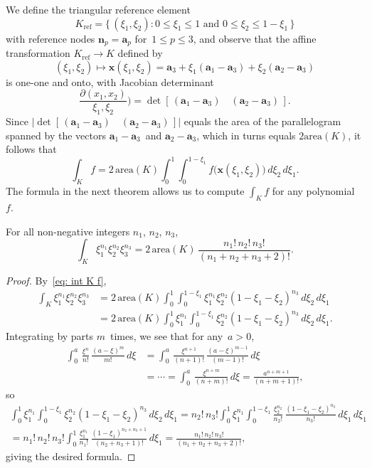 We define the triangular reference element
\[
K_{\mathrm{ref}}=\{\,(\xi_1,\xi_2):
    \text{$0\le\xi_1\le1$ and $0\le\xi_2\le 1-\xi_1$}\,\}
\]
with reference nodes $\boldsymbol{n}_p=\boldsymbol{a}_p$ for~$1\le p\le 3$,
and observe that the affine transformation $K_{\mathrm{ref}}\to K$ defined by
\[
(\xi_1,\xi_2)\mapsto\boldsymbol{x}(\xi_1,\xi_2)=\boldsymbol{a}_3
    +\xi_1(\boldsymbol{a}_1-\boldsymbol{a}_3)
    +\xi_2(\boldsymbol{a}_2-\boldsymbol{a}_3)
\]
is one-one and onto, with Jacobian determinant
\[
\frac{\partial(x_1,x_2)}{\xi_1,\xi_2})
    =\det[\,(\boldsymbol{a}_1-\boldsymbol{a}_3)\quad
            (\boldsymbol{a}_2-\boldsymbol{a}_3)\,].
\]
Since $\bigl|\det[\,(\boldsymbol{a}_1-\boldsymbol{a}_3)\quad
(\boldsymbol{a}_2-\boldsymbol{a}_3)\,]\bigr|$ equals the area of the 
parallelogram spanned by the vectors $\boldsymbol{a}_1-\boldsymbol{a}_3$~and 
$\boldsymbol{a}_2-\boldsymbol{a}_3$, which in turns equals $2\mathrm{area}(K)$, 
it follows that
\begin{equation}\label{eq: int K f}
\int_Kf=2\,\mathrm{area}(K)\int_0^1\int_0^{1-\xi_1}
    f\bigl(\boldsymbol{x}(\xi_1,\xi_2)\bigr)\,d\xi_2\,d\xi_1.
\end{equation}
The formula in the next theorem allows us to compute $\int_Kf$ for any 
polynomial~$f$.

\begin{theorem}\label{thm: int xi}
For all non-negative integers $n_1$, $n_2$, $n_3$,
\[
\int_K\xi_1^{n_1}\xi_2^{n_2}\xi_3^{n_3}=2\,\mathrm{area}(K)\,
    \frac{n_1!\,n_2!\,n_3!}{(n_1+n_2+n_3+2)!}.
\]
\end{theorem}
\begin{proof}
By~\eqref{eq: int K f},
\begin{align*}
\int_K\xi_1^{n_1}\xi_2^{n_2}\xi_3^{n_3}&=2\,\mathrm{area}(K)
    \int_0^1\int_0^{1-\xi_1}\xi_1^{n_1}\xi_2^{n_2}(1-\xi_1-\xi_2)^{n_3}
        \,d\xi_2\,d\xi_1\\
    &=2\,\mathrm{area}(K)
    \int_0^1\xi_1^{n_1}\int_0^{1-\xi_1}\xi_2^{n_2}(1-\xi_1-\xi_2)^{n_3}
        \,d\xi_2\,d\xi_1.
\end{align*}
Integrating by parts $m$~times, we see that for any~$a>0$,
\begin{align*}
\int_0^a\,\frac{\xi^n}{n!}\,\frac{(a-\xi)^m}{m!}\,d\xi
&=\int_0^a\,\frac{\xi^{n+1}}{(n+1)!}\,\frac{(a-\xi)^{m-1}}{(m-1)!}\,d\xi\\
&=\cdots
=\int_0^a\,\frac{\xi^{n+m}}{(n+m)!}\,d\xi=\frac{a^{n+m+1}}{(n+m+1)!},
\end{align*}
so
\begin{multline*}
\int_0^1\xi_1^{n_1}\int_0^{1-\xi_1}\xi_2^{n_2}(1-\xi_1-\xi_2)^{n_3}
        \,d\xi_2\,d\xi_1
    =n_2!\,n_3!\int_0^1\xi_1^{n_1}\int_0^{1-\xi_1}
    \frac{\xi_2^{n_2}}{n_2!}\,\frac{(1-\xi_1-\xi_2)^{n_3}}{n_3!}
        \,d\xi_1\,d\xi_1\\
    =n_1!\,n_2!\,n_3!\int_0^1\frac{\xi_1^{n_1}}{n_1!}\,
        \frac{(1-\xi_1)^{n_2+n_3+1}}{(n_2+n_3+1)!}\,d\xi_1
    =\frac{n_1!\,n_2!\,n_3!}{(n_1+n_2+n_3+2)!},
\end{multline*}
giving the desired formula.
\end{proof}

